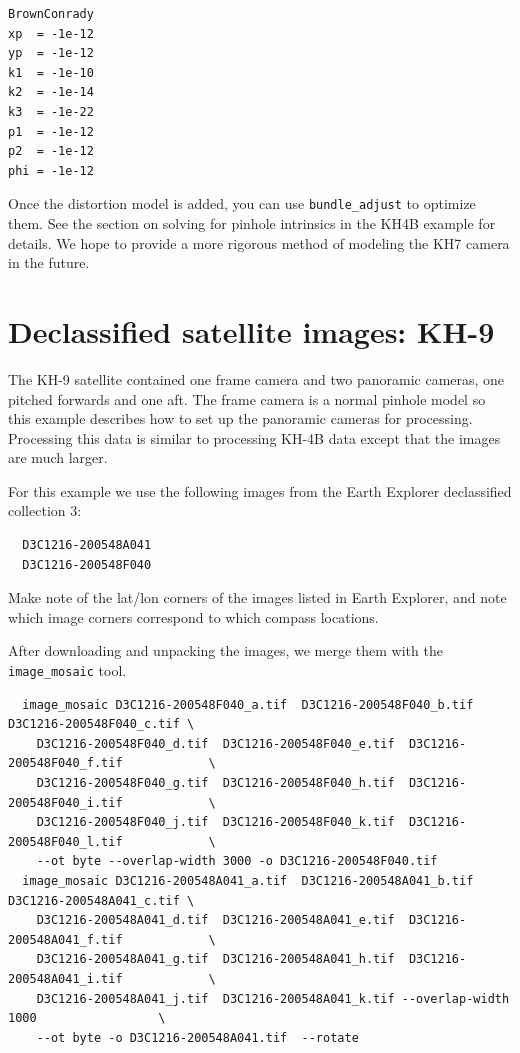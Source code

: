 \begin{verbatim}
BrownConrady
xp  = -1e-12
yp  = -1e-12
k1  = -1e-10
k2  = -1e-14
k3  = -1e-22
p1  = -1e-12
p2  = -1e-12
phi = -1e-12
\end{verbatim}

Once the distortion model is added, you can use \texttt{bundle\_adjust} to optimize
them.  See the section on solving for pinhole intrinsics in the KH4B example for details.
We hope to provide a more rigorous method of modeling the KH7 camera in the future.


\section{Declassified satellite images: KH-9}
\label{kh9}

The KH-9 satellite contained one frame camera and two panoramic cameras,
one pitched forwards and one aft.  The frame camera is a normal pinhole model so
this example describes how to set up the panoramic cameras for processing.
Processing this data is similar to processing KH-4B data except that the 
images are much larger.

For this example we use the following images from the Earth Explorer declassified collection 3:
\begin{verbatim}
  D3C1216-200548A041
  D3C1216-200548F040
\end{verbatim}

Make note of the lat/lon corners of the images listed in Earth Explorer, and note which
image corners correspond to which compass locations.

After downloading and unpacking the images, we merge them with the \texttt{image\_mosaic} tool.

\begin{verbatim}
  image_mosaic D3C1216-200548F040_a.tif  D3C1216-200548F040_b.tif  D3C1216-200548F040_c.tif \
    D3C1216-200548F040_d.tif  D3C1216-200548F040_e.tif  D3C1216-200548F040_f.tif            \
    D3C1216-200548F040_g.tif  D3C1216-200548F040_h.tif  D3C1216-200548F040_i.tif            \
    D3C1216-200548F040_j.tif  D3C1216-200548F040_k.tif  D3C1216-200548F040_l.tif            \
    --ot byte --overlap-width 3000 -o D3C1216-200548F040.tif
  image_mosaic D3C1216-200548A041_a.tif  D3C1216-200548A041_b.tif  D3C1216-200548A041_c.tif \
    D3C1216-200548A041_d.tif  D3C1216-200548A041_e.tif  D3C1216-200548A041_f.tif            \
    D3C1216-200548A041_g.tif  D3C1216-200548A041_h.tif  D3C1216-200548A041_i.tif            \
    D3C1216-200548A041_j.tif  D3C1216-200548A041_k.tif --overlap-width 1000                 \
    --ot byte -o D3C1216-200548A041.tif  --rotate
\end{verbatim}

